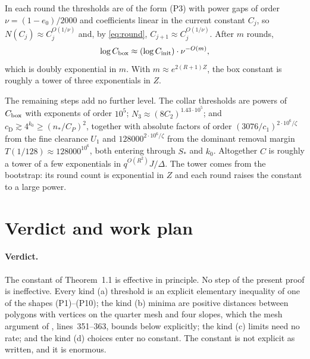 \documentclass[11pt]{article}
\newcommand{\src}[1]{\path{#1}}
\newcommand{\cD}{c_{\mathrm D}}
\begin{document}
In each round the thresholds are of the form (P3) with power gaps of order
$\nu=(1-e_0)/2000$ and coefficients linear in the current constant $C_j$, so
$N(C_j)\approx C_j^{O(1/\nu)}$ and, by \eqref{eq:round},
$C_{j+1}\approx C_j^{O(1/\nu)}$. After $m$ rounds,
\[
    \log C_{\rm box}\approx(\log C_{\rm init})\cdot\nu^{-O(m)},
\]
which is doubly exponential in $m$. With $m\approx e^{2(R+1)Z}$, the box
constant is roughly a tower of three exponentials in $Z$.

The remaining steps add no further level. The collar thresholds are powers of
$C_{\rm box}$ with exponents of order $10^5$; $N_3\approx(8C_2)^{1.43\cdot10^5}$;
and $\cD\gtrsim4^{k_0}\ge(n_*/C_P)^2$, together with absolute factors of order
$(3076/c_1)^{2\cdot10^6/\zeta}$ from the fine clearance $U_1$ and
$128000^{2\cdot10^6/\zeta}$ from the dominant removal margin
$T(1/128)\approx128000^{10^6}$, both entering through $S_*$ and $k_0$. Altogether $C$ is roughly a tower of a few
exponentials in $q^{O(R^2)}J/\Delta$. The tower comes from the bootstrap: its
round count is exponential in $Z$ and each round raises the constant to a large
power.

\section{Verdict and work plan}
\label{sec:verdict}

\paragraph{Verdict.}
The constant of Theorem~1.1 is effective in principle. No step of the present
proof is ineffective. Every kind (a) threshold is an explicit elementary
inequality of one of the shapes (P1)--(P10); the kind (b) minima are positive
distances between polygons with vertices on the quarter mesh and four slopes,
which the mesh argument of \src{10-geometry.tex}, lines~351--363, bounds below
explicitly; the kind (c) limits need no rate; and the kind (d) choices enter no
constant. The constant is not explicit as written, and it is enormous.
\end{document}
